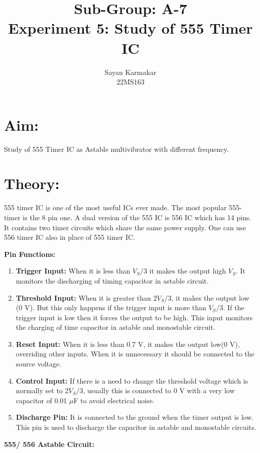 \documentclass[12pt]{article}
\begin{document}
	\title{Sub-Group: A-7 \\ Experiment 5: Study of 555 Timer IC}
	
	
	\author{Sayan Karmakar \\22MS163 }
	\date{}
	\maketitle

\section{Aim:}
Study of 555 Timer IC as Astable multivibrator with different frequency.
\section{Theory:}
555 timer IC is one of the most useful ICs ever made. The most popular 555-timer is the 8 pin one. A dual version of the 555 IC is 556 IC which has 14 pins. It contains two timer circuits which share the same power supply. One can use 556 timer IC also in place of 555 timer IC.

\vspace{1em}\noindent\textbf{Pin Functions: }
\begin{enumerate}
	\item \textbf{Trigger Input:} When it is less than $V_S/3$ it makes the output high $V_S$. It monitors the discharging of timing capacitor in astable circuit.
	\item \textbf{Threshold Input:} When it is greater than $2 V_S/ 3$, it makes the output low (0 V). But this only happens if the trigger input is more than $V_S/ 3$. If the trigger input is low then it forces the output to be high. This input monitors the charging of time capacitor in astable and monostable circuit.
	\item \textbf{Reset Input:} When it is less than 0.7 V, it makes the output low(0 V), overriding other inputs. When it is unnecessary it should be connected to the source voltage.
	\item \textbf{Control Input:} If there is a need to change the threshold voltage which is normally set to $2 V_S/3$,	usually this is connected to 0 V with a very low capacitor of 0.01 $\mu$F to avoid electrical noise.
	\item \textbf{Discharge Pin: } It is connected to the ground when the timer output is low. This pin is used to discharge the capacitor in astable and monostable circuits.
\end{enumerate}
\newpage
\vspace{1em}\noindent
\textbf{555/ 556 Astable Circuit:}
\end{document}
